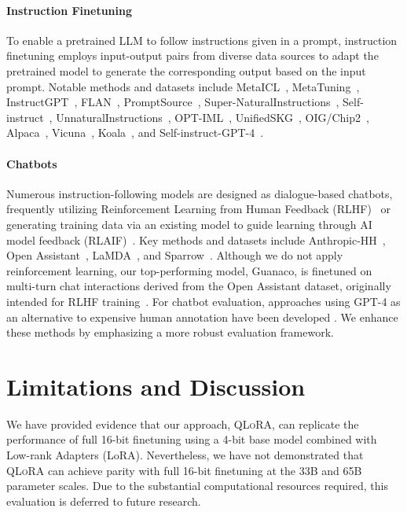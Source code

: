 \paragraph{Instruction Finetuning} To enable a pretrained LLM to follow instructions given in a prompt, instruction finetuning employs input-output pairs from diverse data sources to adapt the pretrained model to generate the corresponding output based on the input prompt. Notable methods and datasets include MetaICL~\citep{min2021metaicl}, MetaTuning~\citep{zhong2021adapting}, InstructGPT~\citep{ouyang2022training}, FLAN~\citep{wei2021finetuned,chung2022scaling}, PromptSource~\citep{bach2022promptsource}, Super-NaturalInstructions~\citep{wang2022super,sanh2021multitask}, Self-instruct~\citep{wang2022self}, UnnaturalInstructions~\citep{honovich2022unnatural}, OPT-IML~\citep{iyer2022opt}, UnifiedSKG~\citep{xie2022unifiedskg}, OIG/Chip2~\citep{laion2023}, Alpaca~\citep{alpaca}, Vicuna~\citep{vicuna2023}, Koala~\citep{koala_blogpost_2023}, and Self-instruct-GPT-4~\citep{peng2023instruction}.

\paragraph{Chatbots} Numerous instruction-following models are designed as dialogue-based chatbots, frequently utilizing Reinforcement Learning from Human Feedback (RLHF)~\citep{christiano2017deep} or generating training data via an existing model to guide learning through AI model feedback (RLAIF)~\citep{bai2022constitutional}. Key methods and datasets include Anthropic-HH~\citep{askell2021general,bai2022training}, Open Assistant~\citep{kopf2023openassistant}, LaMDA~\citep{thoppilan2022lamda}, and Sparrow~\citep{glaese2022improving}. Although we do not apply reinforcement learning, our top-performing model, Guanaco, is finetuned on multi-turn chat interactions derived from the Open Assistant dataset, originally intended for RLHF training~\citep{kopf2023openassistant}. For chatbot evaluation, approaches using GPT-4 as an alternative to expensive human annotation have been developed \citep{vicuna2023,peng2023instruction}. We enhance these methods by emphasizing a more robust evaluation framework.

\section{Limitations and Discussion}

We have provided evidence that our approach, \textsc{QLoRA}, can replicate the performance of full 16-bit finetuning using a 4-bit base model combined with Low-rank Adapters (LoRA). Nevertheless, we have not demonstrated that \textsc{QLoRA} can achieve parity with full 16-bit finetuning at the 33B and 65B parameter scales. Due to the substantial computational resources required, this evaluation is deferred to future research.


